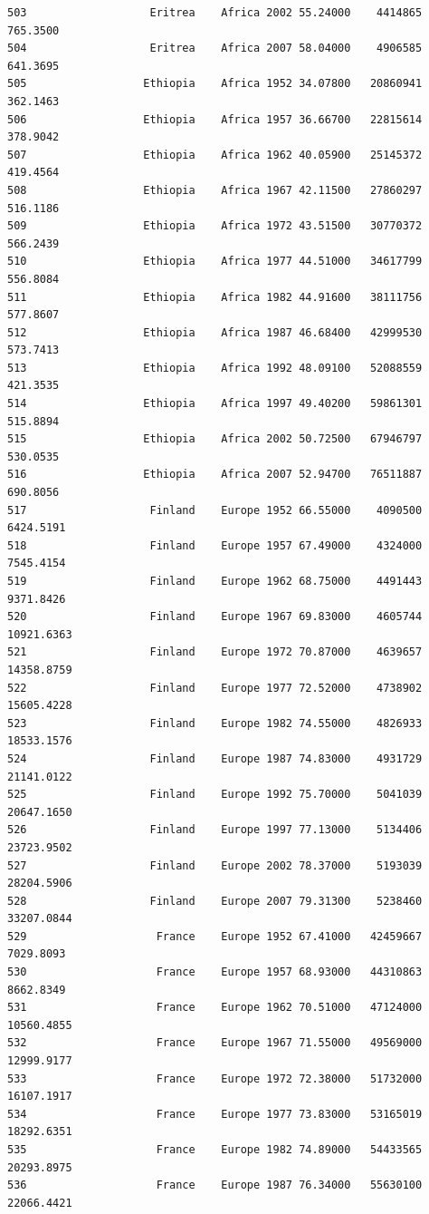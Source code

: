 \documentclass[
  letterpaper,
  DIV=11,
  numbers=noendperiod]{scrreprt}
\begin{document}
\begin{verbatim}
503                   Eritrea    Africa 2002 55.24000    4414865    765.3500
504                   Eritrea    Africa 2007 58.04000    4906585    641.3695
505                  Ethiopia    Africa 1952 34.07800   20860941    362.1463
506                  Ethiopia    Africa 1957 36.66700   22815614    378.9042
507                  Ethiopia    Africa 1962 40.05900   25145372    419.4564
508                  Ethiopia    Africa 1967 42.11500   27860297    516.1186
509                  Ethiopia    Africa 1972 43.51500   30770372    566.2439
510                  Ethiopia    Africa 1977 44.51000   34617799    556.8084
511                  Ethiopia    Africa 1982 44.91600   38111756    577.8607
512                  Ethiopia    Africa 1987 46.68400   42999530    573.7413
513                  Ethiopia    Africa 1992 48.09100   52088559    421.3535
514                  Ethiopia    Africa 1997 49.40200   59861301    515.8894
515                  Ethiopia    Africa 2002 50.72500   67946797    530.0535
516                  Ethiopia    Africa 2007 52.94700   76511887    690.8056
517                   Finland    Europe 1952 66.55000    4090500   6424.5191
518                   Finland    Europe 1957 67.49000    4324000   7545.4154
519                   Finland    Europe 1962 68.75000    4491443   9371.8426
520                   Finland    Europe 1967 69.83000    4605744  10921.6363
521                   Finland    Europe 1972 70.87000    4639657  14358.8759
522                   Finland    Europe 1977 72.52000    4738902  15605.4228
523                   Finland    Europe 1982 74.55000    4826933  18533.1576
524                   Finland    Europe 1987 74.83000    4931729  21141.0122
525                   Finland    Europe 1992 75.70000    5041039  20647.1650
526                   Finland    Europe 1997 77.13000    5134406  23723.9502
527                   Finland    Europe 2002 78.37000    5193039  28204.5906
528                   Finland    Europe 2007 79.31300    5238460  33207.0844
529                    France    Europe 1952 67.41000   42459667   7029.8093
530                    France    Europe 1957 68.93000   44310863   8662.8349
531                    France    Europe 1962 70.51000   47124000  10560.4855
532                    France    Europe 1967 71.55000   49569000  12999.9177
533                    France    Europe 1972 72.38000   51732000  16107.1917
534                    France    Europe 1977 73.83000   53165019  18292.6351
535                    France    Europe 1982 74.89000   54433565  20293.8975
536                    France    Europe 1987 76.34000   55630100  22066.4421

\end{verbatim}
\end{document}
